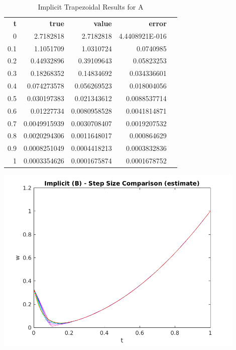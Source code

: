 \documentclass{article}
\begin{document}
\begin{table}
\footnotesize
\centering
\caption{Implicit Trapezoidal Results for A}
\label{tab:a_implcit}
\begin{tabular}{rrrrl}
\textbf{t} & \textbf{true} & \textbf{value} & \textbf{error} &  \\
0          & 2.7182818     & 2.7182818      & 4.4408921E-016 &  \\
0.1        & 1.1051709     & 1.0310724      & 0.0740985      &  \\
0.2        & 0.44932896    & 0.39109643     & 0.05823253     &  \\
0.3        & 0.18268352    & 0.14834692     & 0.034336601    &  \\
0.4        & 0.074273578   & 0.056269523    & 0.018004056    &  \\
0.5        & 0.030197383   & 0.021343612    & 0.0088537714   &  \\
0.6        & 0.01227734    & 0.0080958528   & 0.0041814871   &  \\
0.7        & 0.0049915939  & 0.0030708407   & 0.0019207532   &  \\
0.8        & 0.0020294306  & 0.0011648017   & 0.000864629    &  \\
0.9        & 0.0008251049  & 0.0004418213   & 0.0003832836   &  \\
1          & 0.0003354626  & 0.0001675874   & 0.0001678752   
\end{tabular}
\end{table}

\begin{center}
  \includegraphics[width=0.9\textwidth]{../output/b_implicit_h_val.png}
  \label{fig:b_implicit_h_val}
\end{center}
\end{document}
